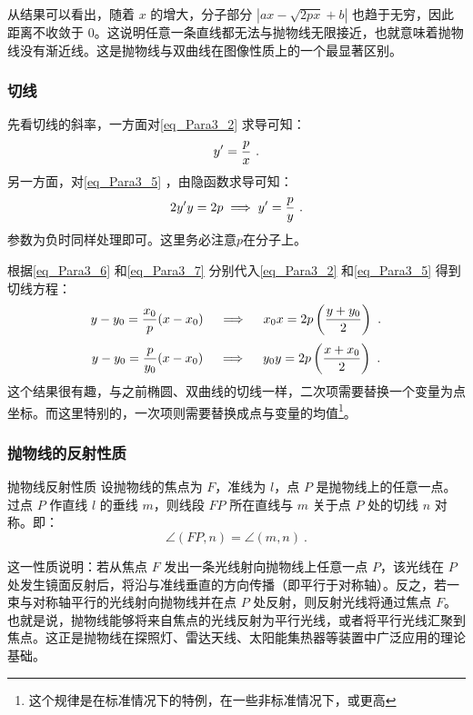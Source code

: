 从结果可以看出，随着 $x$ 的增大，分子部分 $|ax - \sqrt{2px} + b|$ 也趋于无穷，因此距离不收敛于 $0$。这说明任意一条直线都无法与抛物线无限接近，也就意味着抛物线没有渐近线。这是抛物线与双曲线在图像性质上的一个最显著区别。

\subsubsection{切线}

先看切线的斜率，一方面对\autoref{eq_Para3_2} 求导可知：
\begin{equation}\label{eq_Para3_6}
y'={p\over x}~.
\end{equation}
另一方面，对\autoref{eq_Para3_5} ，由隐函数求导可知：
\begin{equation}\label{eq_Para3_7}
2y'y=2p\implies y'={p\over y}~.
\end{equation}
参数为负时同样处理即可。这里务必注意$p$在分子上。

根据\autoref{eq_Para3_6} 和\autoref{eq_Para3_7} 分别代入\autoref{eq_Para3_2} 和\autoref{eq_Para3_5} 得到切线方程：
\begin{equation}
y-y_0={x_0\over p}(x-x_0)\quad\implies\quad x_0x=2p\left(\frac{y+y_0}{2}\right)~.
\end{equation}
\begin{equation}
y-y_0={p\over y_0}(x-x_0)\quad\implies\quad y_0y=2p\left(\frac{x+x_0}{2}\right)~.
\end{equation}
这个结果很有趣，与之前椭圆、双曲线的切线一样，二次项需要替换一个变量为点坐标。而这里特别的，一次项则需要替换成点与变量的均值\footnote{这个规律是在标准情况下的特例，在一些非标准情况下，或更高}。

\subsubsection{抛物线的反射性质}

\begin{theorem}{抛物线反射性质}
设抛物线的焦点为 $F$，准线为 $l$，点 $P$ 是抛物线上的任意一点。过点 $P$ 作直线 $l$ 的垂线 $m$，则线段 $FP$ 所在直线与 $m$ 关于点 $P$ 处的切线 $n$ 对称。即：
\begin{equation}
\angle(FP, n) = \angle(m, n)~.
\end{equation}
\end{theorem}

这一性质说明：若从焦点 $F$ 发出一条光线射向抛物线上任意一点 $P$，该光线在 $P$ 处发生镜面反射后，将沿与准线垂直的方向传播（即平行于对称轴）。反之，若一束与对称轴平行的光线射向抛物线并在点 $P$ 处反射，则反射光线将通过焦点 $F$。也就是说，抛物线能够将来自焦点的光线反射为平行光线，或者将平行光线汇聚到焦点。这正是抛物线在探照灯、雷达天线、太阳能集热器等装置中广泛应用的理论基础。

